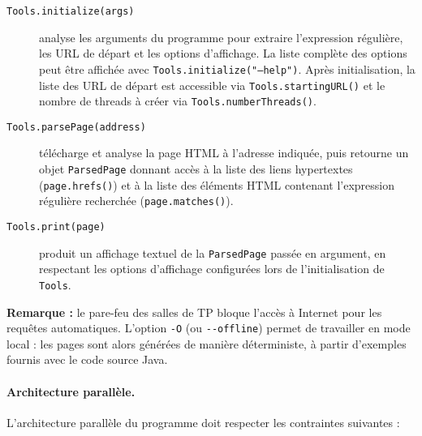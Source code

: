 \documentclass{td}
\begin{document}
\begin{description}
  \item[\texttt{Tools.initialize(args)}] analyse les arguments du programme pour extraire l'expression régulière, les URL de départ et les options d'affichage.  
  La liste complète des options peut être affichée avec \texttt{Tools.initialize("--help")}.  
  Après initialisation, la liste des URL de départ est accessible via \texttt{Tools.startingURL()}  
  et le nombre de threads à créer via \texttt{Tools.numberThreads()}.

  \item[\texttt{Tools.parsePage(address)}] télécharge et analyse la page HTML à l'adresse indiquée,  
  puis retourne un objet \texttt{ParsedPage} donnant accès à la liste des liens hypertextes  
  (\texttt{page.hrefs()}) et à la liste des éléments HTML contenant l'expression régulière recherchée  
  (\texttt{page.matches()}).

  \item[\texttt{Tools.print(page)}] produit un affichage textuel de la \texttt{ParsedPage} passée en argument,
  en respectant les options d'affichage configurées lors de l'initialisation de \texttt{Tools}.
\end{description}

\medskip
\noindent
\textbf{Remarque :} le pare-feu des salles de TP bloque l'accès à Internet pour les requêtes automatiques.
L'option \lstinline{-O} (ou \lstinline{--offline}) permet de travailler en mode local :
les pages sont alors générées de manière déterministe, à partir d'exemples fournis avec le code source Java.

\paragraph{Architecture parallèle.}

L'architecture parallèle du programme doit respecter les contraintes suivantes :
\end{document}
